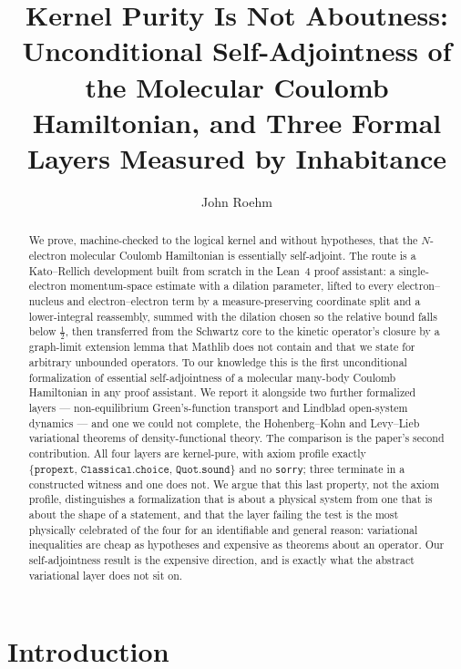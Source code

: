 \documentclass[aps,prd,reprint,nofootinbib,superscriptaddress]{revtex4-2}
\newcommand{\Lean}{Lean~4}
\begin{document}
\title{Kernel Purity Is Not Aboutness: Unconditional Self-Adjointness of the
Molecular Coulomb Hamiltonian, and Three Formal Layers Measured by Inhabitance}

\author{John Roehm}

\begin{abstract}
We prove, machine-checked to the logical kernel and without hypotheses, that the $N$-electron
molecular Coulomb Hamiltonian is essentially self-adjoint. The route is a Kato--Rellich development
built from scratch in the \Lean{} proof assistant: a single-electron momentum-space estimate with a
dilation parameter, lifted to every electron--nucleus and electron--electron term by a
measure-preserving coordinate split and a lower-integral reassembly, summed with the dilation chosen
so the relative bound falls below $\tfrac12$, then transferred from the Schwartz core to the kinetic
operator's closure by a graph-limit extension lemma that Mathlib does not contain and that we state
for arbitrary unbounded operators. To our knowledge this is the first unconditional formalization of
essential self-adjointness of a molecular many-body Coulomb Hamiltonian in any proof assistant. We
report it alongside two further formalized layers ---
non-equilibrium Green's-function transport and Lindblad open-system dynamics --- and one we could not
complete, the Hohenberg--Kohn and Levy--Lieb variational theorems of density-functional theory. The
comparison is the paper's second contribution. All four layers are kernel-pure, with axiom profile
exactly $\{\texttt{propext},\,\texttt{Classical.choice},\,\texttt{Quot.sound}\}$ and no
\texttt{sorry}; three terminate in a constructed witness and one does not. We argue that this last
property, not the axiom profile, distinguishes a formalization that is about a physical system from
one that is about the shape of a statement, and that the layer failing the test is the most
physically celebrated of the four for an identifiable and general reason: variational inequalities
are cheap as hypotheses and expensive as theorems about an operator. Our self-adjointness result is
the expensive direction, and is exactly what the abstract variational layer does not sit on.
\end{abstract}

\maketitle

\section{Introduction}
\label{sec:intro}
\end{document}
